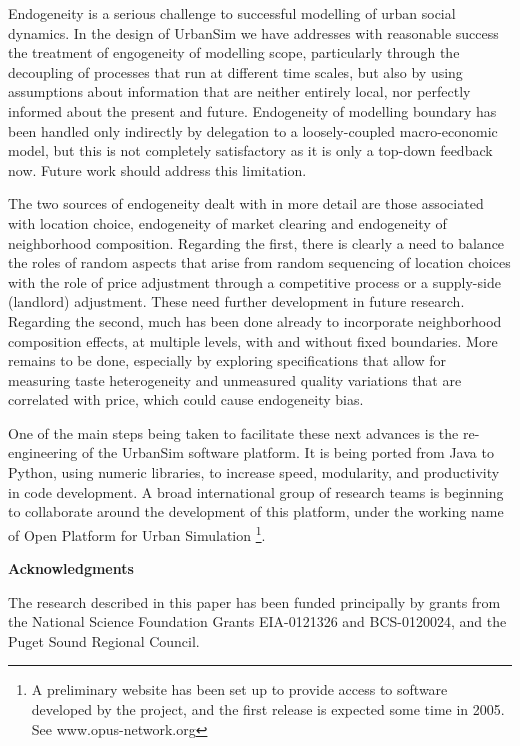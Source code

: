 \documentclass[12pt,a4paper]{article}
\begin{document}
Endogeneity is a serious challenge to successful modelling of
urban social dynamics.  In the design of UrbanSim we have
addresses with reasonable success the treatment of engogeneity of
modelling scope, particularly through the decoupling of processes
that run at different time scales, but also by using assumptions
about information that are neither entirely local, nor perfectly
informed about the present and future.  Endogeneity of modelling
boundary has been handled only indirectly by delegation to a
loosely-coupled macro-economic model, but this is not completely
satisfactory as it is only a top-down feedback now.  Future work
should address this limitation.

The two sources of endogeneity dealt with in more detail are those
associated with location choice, endogeneity of market clearing
and endogeneity of neighborhood composition. Regarding the first,
there is clearly a need to balance the roles of random aspects
that arise from random sequencing of location choices with the
role of price adjustment through a competitive process or a
supply-side (landlord) adjustment.  These need further development
in future research.  Regarding the second, much has been done
already to incorporate neighborhood composition effects, at
multiple levels, with and without fixed boundaries.  More remains
to be done, especially by exploring specifications that allow for
measuring taste heterogeneity and unmeasured quality variations
that are correlated with price, which could cause endogeneity
bias.

One of the main steps being taken to facilitate these next
advances is the re-engineering of the UrbanSim software platform.
It is being ported from Java to Python, using numeric libraries,
to increase speed, modularity, and productivity in code
development.  A broad international group of research teams is
beginning to collaborate around the development of this platform,
under the working name of Open Platform for Urban Simulation
\footnote{A preliminary website has been set up to provide access
to software developed by the project, and the first release is
expected some time in 2005.  See www.opus-network.org}.

\vspace{1cm} {\bf \large Acknowledgments}

The research described in this paper has been funded principally
by grants from the National Science Foundation Grants EIA-0121326
and BCS-0120024, and the Puget Sound Regional Council.
\end{document}
